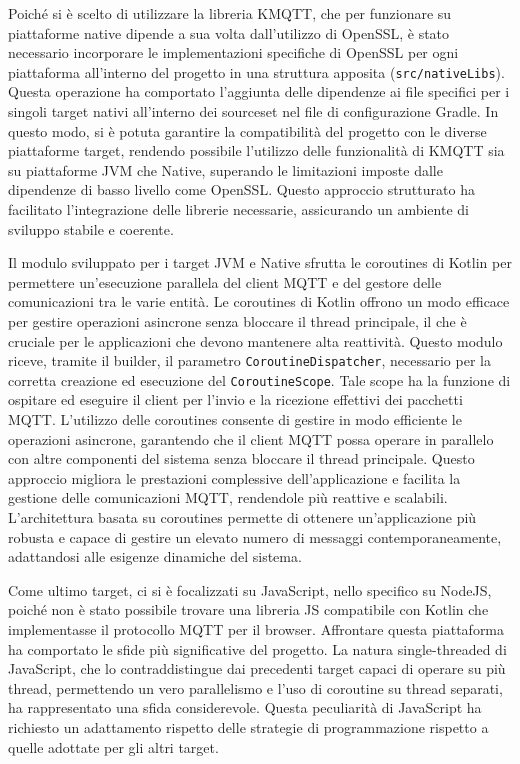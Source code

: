 \documentclass[12pt,a4paper,openright,twoside]{book}
\begin{document}
Poiché si è scelto di utilizzare la libreria KMQTT, che per funzionare su piattaforme native dipende a sua volta dall'utilizzo di OpenSSL, 
è stato necessario incorporare le implementazioni specifiche di OpenSSL per ogni piattaforma all'interno del progetto in una struttura apposita (\texttt{src/nativeLibs}). 
Questa operazione ha comportato l'aggiunta delle dipendenze ai file specifici per i singoli target nativi all'interno dei sourceset nel file di configurazione Gradle. 
In questo modo, si è potuta garantire la compatibilità del progetto con le diverse piattaforme target, rendendo possibile l'utilizzo delle funzionalità di KMQTT sia su 
piattaforme \ac{JVM} che Native, superando le limitazioni imposte dalle dipendenze di basso livello come OpenSSL. Questo approccio strutturato ha facilitato l'integrazione 
delle librerie necessarie, assicurando un ambiente di sviluppo stabile e coerente.

Il modulo sviluppato per i target \ac{JVM} e Native sfrutta le coroutines di Kotlin per permettere un'esecuzione parallela del client \ac{MQTT} e del gestore delle 
comunicazioni tra le varie entità. Le coroutines di Kotlin offrono un modo efficace per gestire operazioni asincrone senza bloccare il thread principale, il che è cruciale 
per le applicazioni che devono mantenere alta reattività. Questo modulo riceve, tramite il builder, il parametro \texttt{CoroutineDispatcher}, necessario per la corretta 
creazione ed esecuzione del \texttt{CoroutineScope}. Tale scope ha la funzione di ospitare ed eseguire il client per l'invio e la ricezione effettivi dei pacchetti \ac{MQTT}.
L'utilizzo delle coroutines consente di gestire in modo efficiente le operazioni asincrone, garantendo che il client \ac{MQTT} possa operare in parallelo con altre componenti 
del sistema senza bloccare il thread principale. Questo approccio migliora le prestazioni complessive dell'applicazione e facilita la gestione delle comunicazioni \ac{MQTT}, 
rendendole più reattive e scalabili. L'architettura basata su coroutines permette di ottenere un'applicazione più robusta e capace di gestire un elevato numero di messaggi 
contemporaneamente, adattandosi alle esigenze dinamiche del sistema.

Come ultimo target, ci si è focalizzati su JavaScript, nello specifico su NodeJS, poiché non è stato possibile trovare una libreria \ac{JS} compatibile con Kotlin 
che implementasse il protocollo \ac{MQTT} per il browser. Affrontare questa piattaforma ha comportato le sfide più significative del progetto. 
La natura single-threaded di JavaScript, che lo contraddistingue dai precedenti target capaci di operare su più thread, permettendo un vero parallelismo e l'uso 
di coroutine su thread separati, ha rappresentato una sfida considerevole. Questa peculiarità di JavaScript ha richiesto un adattamento rispetto delle 
strategie di programmazione rispetto a quelle adottate per gli altri target.
\end{document}
